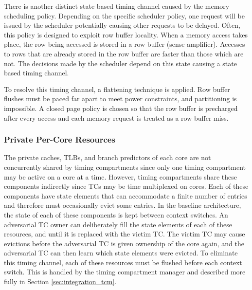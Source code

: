 There is another distinct state based timing channel caused by the memory 
scheduling policy. Depending on the specific scheduler policy, one request will 
be issued by the scheduler potentially causing other requests to be delayed.  
Often, this policy is designed to exploit row buffer locality. When a memory 
access takes place, the row being accessed is stored in a row buffer (sense 
amplifier). Accesses to rows that are already stored in the row buffer are 
faster than those which are not. The decisions made by the scheduler depend on 
this state causing a state based timing channel.

To resolve this timing channel, a flattening technique is applied. Row buffer 
flushes must be paced far apart to meet power constraints, and partitioning is 
impossible. A closed page policy is chosen so that the row buffer is precharged 
after every access and each memory request is treated as a row buffer miss.


\subsubsection{Private Per-Core Resources}

The private caches, TLBs, and branch predictors of each core are not 
concurrently shared by timing compartments since only one timing compartment 
may be active on a core at a time. However, timing compartments share these 
components indirectly since TCs may be time multiplexed on cores.  Each of 
these components have state elements that can accommodate a finite number of 
entries and therefore must occasionally evict some entries. In the baseline 
architecture, the state of each of these components is kept between context 
switches. An adversarial TC owner can deliberately fill the state elements of 
each of these resources, and until it is replaced with the victim TC. The 
victim TC may cause evictions before the adversarial TC is given ownership of 
the core again, and the adversarial TC can then learn which state elements were 
evicted. To eliminate this timing channel, each of these resources must be 
flushed before each context switch. This is handled by the timing compartment 
manager and described more fully in Section \ref{sec:integration_tcm}.
